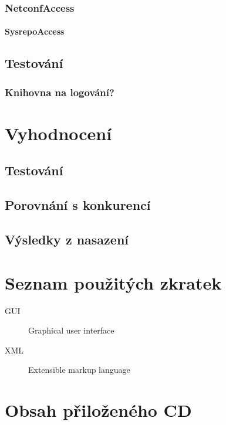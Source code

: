 \documentclass[thesis=B,czech,hidelinks]{FITthesis}[2019/03/06]
\begin{document}
\subsection{NetconfAccess}

\subsubsection{SysrepoAccess}

\section{Testování}

\subsection{Knihovna na logování?}


\chapter{Vyhodnocení}
\section{Testování}
\section{Porovnání s konkurencí}
\section{Výsledky z nasazení}

\begin{conclusion}
\end{conclusion}

\printbibliography{}

\appendix

\chapter{Seznam použitých zkratek}
\begin{description}
    \item[GUI] Graphical user interface
    \item[XML] Extensible markup language
\end{description}

\chapter{Obsah přiloženého CD}

\end{document}
